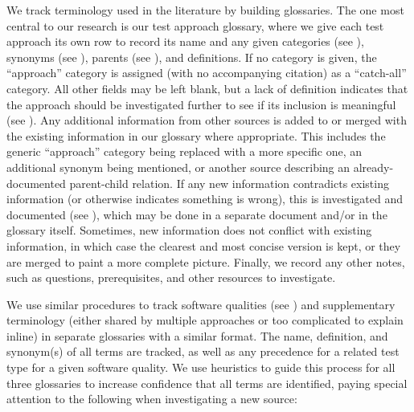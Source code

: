 We track terminology used in the literature by building glossaries. The one
most central to our research is our test approach glossary, where we give each
test approach its own row to
record its name and any given categories (see ),
synonyms (see ), parents (see ), and
definitions. If no category is given, the ``approach'' category is assigned
(with no accompanying citation) as a ``catch-all'' category. All other fields
may be left blank, but a lack of definition indicates that the approach should
be investigated further to see if its inclusion is meaningful (see
). Any additional information from other sources is added to
or merged with the existing information in our glossary where appropriate.
This includes the generic ``approach'' category being replaced with a more
specific one, an additional synonym being mentioned, or another source
describing an already-documented parent-child relation. If any new information
contradicts existing information (or otherwise indicates something is wrong),
this is investigated and documented (see ), which may be done
in a separate document and/or in the glossary itself. Sometimes, new
information does not conflict with existing information, in which case the
clearest and most concise version is kept, or they are merged to paint a more
complete picture. Finally, we record any other notes, such as questions,
prerequisites, and other resources to investigate.

We use similar procedures to track software qualities \ifnotpaper (see
    ) \fi and supplementary terminology (either shared by
multiple approaches or too complicated to explain inline) in separate
glossaries with a similar format. The name, definition, and synonym(s) of all
terms are tracked, as well as any precedence for a related test type for a
given software quality. We use heuristics to guide this process for all three
glossaries to increase confidence that all terms are identified, paying
special attention to the following when investigating a new source:

